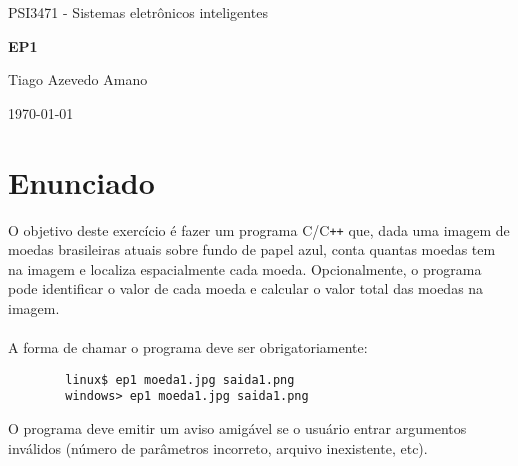 \documentclass[titlepage,12pt,a4paper]{article}
\begin{document}
    \begin{titlepage}
        \centering
        {\LARGE PSI3471 - Sistemas eletrônicos inteligentes \par} 
        \vfill
        {\Huge\bfseries EP1 \par}
        \vfill
        \raggedleft
        {\large Tiago Azevedo Amano  \par}
        \vspace{2.5cm}
        \centering
        {\today\par}
    \end{titlepage}
    \tableofcontents
    \vspace{2cm}
    \hline
    \section{Enunciado}
    \label{sec:enunciado}
    O objetivo deste exercício é fazer um programa C/C\texttt{++} que, dada uma imagem de moedas brasileiras atuais sobre fundo de papel azul, conta quantas moedas tem na imagem e localiza espacialmente cada moeda. Opcionalmente, o programa pode identificar o valor de cada moeda e calcular o valor total das moedas na imagem.\\\\
    A forma de chamar o programa deve ser obrigatoriamente:
    \begin{lstlisting}
        linux$ ep1 moeda1.jpg saida1.png
        windows> ep1 moeda1.jpg saida1.png
    \end{lstlisting}
    O programa deve emitir um aviso amigável se o usuário entrar argumentos inválidos (número de parâmetros incorreto, arquivo inexistente, etc).\\\\
\end{document}
